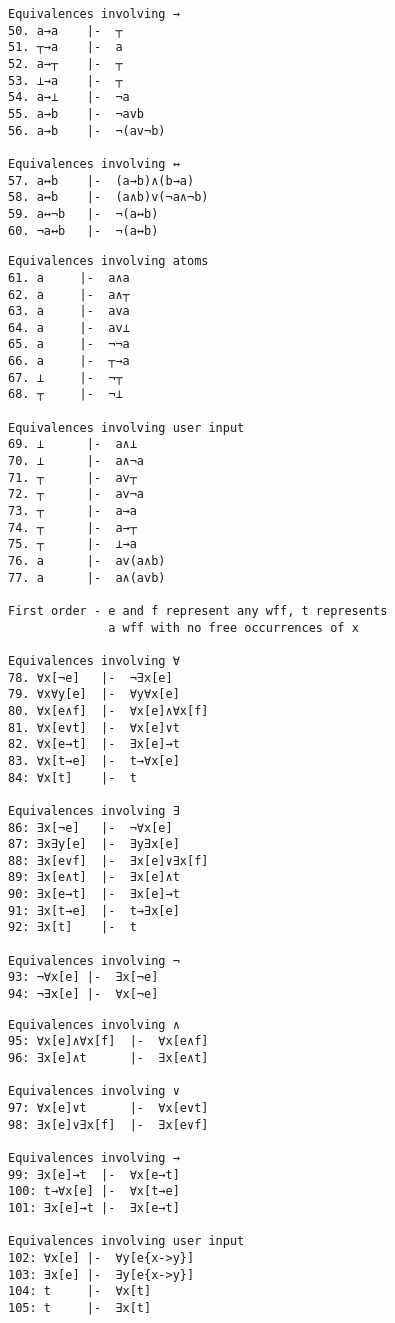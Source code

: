 \documentclass[draft]{report}
\begin{document}
\begin{appendices}
\begin{listing}[ht]
\begin{verbatim}
Equivalences involving →
50. a→a    |-  ┬
51. ┬→a    |-  a
52. a→┬    |-  ┬
53. ⊥→a    |-  ┬
54. a→⊥    |-  ¬a
55. a→b    |-  ¬avb
56. a→b    |-  ¬(av¬b)

Equivalences involving ↔
57. a↔b    |-  (a→b)∧(b→a)
58. a↔b    |-  (a∧b)v(¬a∧¬b)
59. a↔¬b   |-  ¬(a↔b)
60. ¬a↔b   |-  ¬(a↔b)
\end{verbatim}
\end{listing}

\begin{listing}[ht]
\begin{verbatim}
Equivalences involving atoms
61. a     |-  a∧a
62. a     |-  a∧┬
63. a     |-  ava
64. a     |-  av⊥
65. a     |-  ¬¬a
66. a     |-  ┬→a
67. ⊥     |-  ¬┬
68. ┬     |-  ¬⊥

Equivalences involving user input
69. ⊥      |-  a∧⊥
70. ⊥      |-  a∧¬a
71. ┬      |-  av┬
72. ┬      |-  av¬a
73. ┬      |-  a→a 
74. ┬      |-  a→┬
75. ┬      |-  ⊥→a
76. a      |-  av(a∧b)
77. a      |-  a∧(avb)
 
First order - e and f represent any wff, t represents 
              a wff with no free occurrences of x 

Equivalences involving ∀
78. ∀x[¬e]   |-  ¬∃x[e] 
79. ∀x∀y[e]  |-  ∀y∀x[e]
80. ∀x[e∧f]  |-  ∀x[e]∧∀x[f]
81. ∀x[e∨t]  |-  ∀x[e]∨t
82. ∀x[e→t]  |-  ∃x[e]→t
83. ∀x[t→e]  |-  t→∀x[e]
84: ∀x[t]    |-  t

Equivalences involving ∃
86: ∃x[¬e]   |-  ¬∀x[e]
87: ∃x∃y[e]  |-  ∃y∃x[e]
88: ∃x[e∨f]  |-  ∃x[e]∨∃x[f]
89: ∃x[e∧t]  |-  ∃x[e]∧t
90: ∃x[e→t]  |-  ∃x[e]→t
91: ∃x[t→e]  |-  t→∃x[e]
92: ∃x[t]    |-  t

Equivalences involving ¬
93: ¬∀x[e] |-  ∃x[¬e]
94: ¬∃x[e] |-  ∀x[¬e]
\end{verbatim}
\end{listing}

\begin{listing}[ht]
\begin{verbatim}
Equivalences involving ∧
95: ∀x[e]∧∀x[f]  |-  ∀x[e∧f]
96: ∃x[e]∧t      |-  ∃x[e∧t]

Equivalences involving ∨
97: ∀x[e]∨t      |-  ∀x[e∨t]
98: ∃x[e]∨∃x[f]  |-  ∃x[e∨f]

Equivalences involving →
99: ∃x[e]→t  |-  ∀x[e→t]
100: t→∀x[e] |-  ∀x[t→e]
101: ∃x[e]→t |-  ∃x[e→t]

Equivalences involving user input
102: ∀x[e] |-  ∀y[e{x->y}]
103: ∃x[e] |-  ∃y[e{x->y}]
104: t     |-  ∀x[t]
105: t     |-  ∃x[t]
\end{verbatim}
\end{listing}

\end{appendices}
\end{document}
